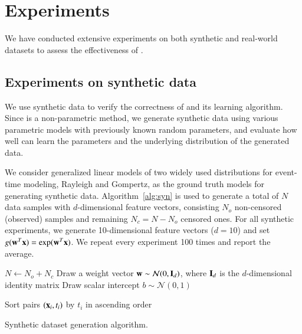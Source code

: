 \section{Experiments}\label{sec:results}

We have conducted extensive experiments on both synthetic and real-world datasets to assess the effectiveness of \npglm.

\subsection{Experiments on synthetic data}
We use synthetic data to verify the correctness of \npglm and its learning algorithm. Since \npglm is a non-parametric method, we generate synthetic data using various parametric models with previously known random parameters, and evaluate how well \npglm can learn the parameters and the underlying distribution of the generated data.

We consider generalized linear models of two widely used distributions for event-time modeling, Rayleigh and Gompertz, as the ground truth models for generating synthetic data. Algorithm~\ref{alg:syn} is used to generate a total of $N$ data samples with $d$-dimensional feature vectors, consisting $N_o$ non-censored (observed) samples and remaining $N_c=N-N_o$ censored ones. For all synthetic experiments, we generate 10-dimensional feature vectors ($d=10$) and set $g(\mathbf{w}^T\mathbf{x})=\exp(\mathbf{w}^T\mathbf{x})$. We repeat every experiment 100 times and report the average.

\begin{algorithm}[t]
	\small
	\SetAlgoLined
	$N\leftarrow N_o+N_c$\;
	Draw a weight vector $\mathbf{w}\sim\mathcal{N}(0,\mathbf{I}_d)$, where $\mathbf{I}_d$ is the $d$-dimensional identity matrix\;
	Draw scalar intercept $b\sim\mathcal{N}(0,1)$\;
	
	Sort pairs $(\mathbf{x}_i,t_i)$ by $t_i$ in ascending order\;
	
	\caption{Synthetic dataset generation algorithm.}
	\label{alg:syn}
\end{algorithm}


